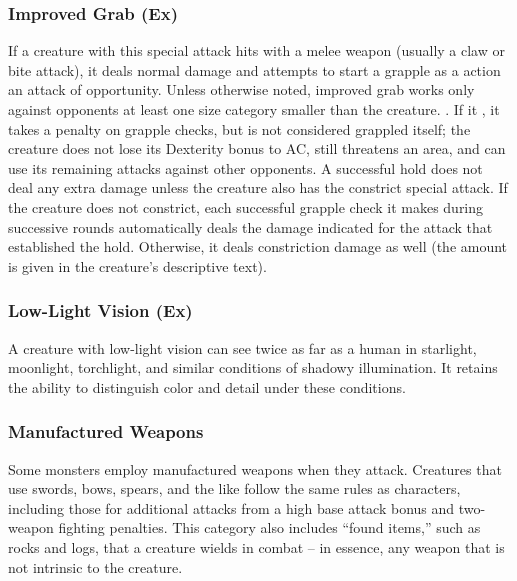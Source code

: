 {\subsubsection{Improved Grab (Ex)} If a creature with this special attack hits with a melee weapon (usually a claw or bite attack), it deals normal damage and attempts to start a grapple as a  action  an attack of opportunity. Unless otherwise noted, improved grab works only against opponents at least one size category smaller than the creature. . If it , it takes a  penalty on grapple checks, but is not considered grappled itself; the creature does not lose its Dexterity bonus  to AC, still threatens an area, and can use its remaining attacks against other opponents. A successful hold does not deal any extra damage unless the creature also has the constrict special attack. If the creature does not constrict, each successful grapple check it makes during successive rounds automatically deals the damage indicated for the attack that established the hold. Otherwise, it deals constriction damage as well (the amount is given in the creature's descriptive text).

\subsubsection{Low-Light Vision (Ex)} A creature with low-light vision can see twice as far as a human in starlight, moonlight, torchlight, and similar conditions of shadowy illumination. It retains the ability to distinguish color and detail under these conditions.

\subsubsection{Manufactured Weapons} Some monsters employ manufactured weapons when they attack. Creatures that use swords, bows, spears, and the like follow the same rules as characters, including those for additional attacks from a high base attack bonus and two-weapon fighting penalties. This category also includes ``found items,'' such as rocks and logs, that a creature wields in combat -- in essence, any weapon that is not intrinsic to the creature.

}
